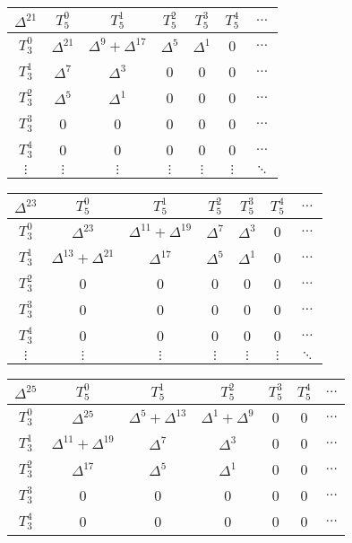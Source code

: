 \begin{center}
\begin{tabular}{|c|cccccc|}
	\textbf{$\Delta^{21}$} & \textbf{$T_5^0$} & \textbf{$T_5^1$} & \textbf{$T_5^2$} & \textbf{$T_5^3$} & \textbf{$T_5^4$} & \textbf{$\dots$} \\\hline
	$T_3^0$ & $\Delta^{21}$ & $\Delta^9 + \Delta^{17}$ & $\Delta^5$ & $\Delta^1$ & 0 & $\dots$ \\
	$T_3^1$ & $\Delta^7$ & $\Delta^3$ & 0 & 0 & 0 & $\dots$ \\
	$T_3^2$ & $\Delta^5$ & $\Delta^1$ & 0 & 0 & 0 & $\dots$ \\
	$T_3^3$ & 0 & 0 & 0 & 0 & 0 & $\dots$ \\
	$T_3^4$ & 0 & 0 & 0 & 0 & 0 & $\dots$ \\
	$\vdots$ & $\vdots$ & $\vdots$ & $\vdots$ & $\vdots$ & $\vdots$ & $\ddots$ \\\hline
\end{tabular}
\begin{tabular}{|c|cccccc|}
	\hline
	\textbf{$\Delta^{23}$} & \textbf{$T_5^0$} & \textbf{$T_5^1$} & \textbf{$T_5^2$} & \textbf{$T_5^3$} & \textbf{$T_5^4$} & \textbf{$\dots$} \\
	\hline
	$T_3^0$ & $\Delta^{23}$ & $\Delta^{11} + \Delta^{19}$ & $\Delta^7$ & $\Delta^3$ & 0 & $\dots$ \\
	$T_3^1$ & $\Delta^{13} + \Delta^{21}$ & $\Delta^{17}$ & $\Delta^5$ & $\Delta^1$ & 0 & $\dots$ \\
	$T_3^2$ & 0 & 0 & 0 & 0 & 0 & $\dots$ \\
	$T_3^3$ & 0 & 0 & 0 & 0 & 0 & $\dots$ \\
	$T_3^4$ & 0 & 0 & 0 & 0 & 0 & $\dots$ \\
	$\vdots$ & $\vdots$ & $\vdots$ & $\vdots$ & $\vdots$ & $\vdots$ & $\ddots$ \\
	\hline
\end{tabular}
\begin{tabular}{|c|cccccc|}
	\hline
	\textbf{$\Delta^{25}$} & \textbf{$T_5^0$} & \textbf{$T_5^1$} & \textbf{$T_5^2$} & \textbf{$T_5^3$} & \textbf{$T_5^4$} & \textbf{$\dots$} \\
	\hline
	$T_3^0$ & $\Delta^{25}$ & $\Delta^5 + \Delta^{13}$ & $\Delta^1 + \Delta^9$ & 0 & 0 & $\dots$ \\
	$T_3^1$ & $\Delta^{11} + \Delta^{19}$ & $\Delta^7$ & $\Delta^3$ & 0 & 0 & $\dots$ \\
	$T_3^2$ & $\Delta^{17}$ & $\Delta^5$ & $\Delta^1$ & 0 & 0 & $\dots$ \\
	$T_3^3$ & 0 & 0 & 0 & 0 & 0 & $\dots$ \\
	$T_3^4$ & 0 & 0 & 0 & 0 & 0 & $\dots$ \\

\end{tabular}
\end{center}
